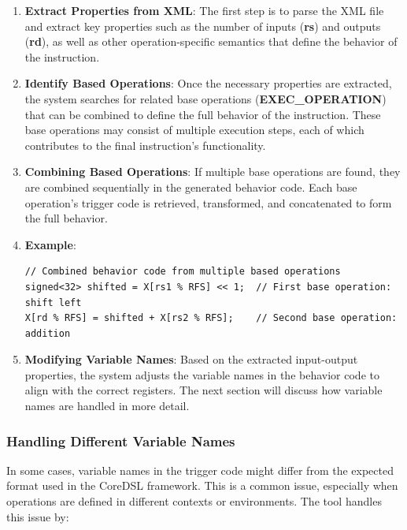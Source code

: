 \begin{enumerate}
    \item \textbf{Extract Properties from XML}: The first step is to parse the XML file and extract key properties such as the number of inputs (\textbf{rs}) and outputs (\textbf{rd}), as well as other operation-specific semantics that define the behavior of the instruction.

    \item \textbf{Identify Based Operations}: Once the necessary properties are extracted, the system searches for related base operations (\textbf{EXEC\_OPERATION}) that can be combined to define the full behavior of the instruction. These base operations may consist of multiple execution steps, each of which contributes to the final instruction's functionality.

    \item \textbf{Combining Based Operations}: If multiple base operations are found, they are combined sequentially in the generated behavior code. Each base operation's trigger code is retrieved, transformed, and concatenated to form the full behavior.

    \item \textbf{Example}:
    \begin{lstlisting}
// Combined behavior code from multiple based operations
signed<32> shifted = X[rs1 % RFS] << 1;  // First base operation: shift left
X[rd % RFS] = shifted + X[rs2 % RFS];    // Second base operation: addition
    \end{lstlisting}

    \item \textbf{Modifying Variable Names}: Based on the extracted input-output properties, the system adjusts the variable names in the behavior code to align with the correct registers. The next section will discuss how variable names are handled in more detail.
\end{enumerate}

\subsubsection{Handling Different Variable Names}

In some cases, variable names in the trigger code might differ from the expected format used in the CoreDSL framework. This is a common issue, especially when operations are defined in different contexts or environments. The tool handles this issue by:

